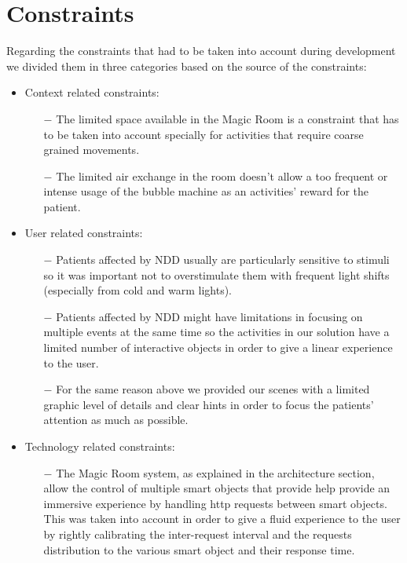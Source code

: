 \section{Constraints}
	Regarding the constraints that had to be taken into account during development we divided them in three categories based on the source of the constraints:
	\begin{itemize}
		\item Context related constraints:
		\begin{itemize}
			\item[$ - $] The limited space available in the Magic Room is a constraint that has to be taken into account specially for activities that require coarse grained movements.
			\item[$ - $] The limited air exchange in the room doesn't allow a too frequent or intense usage of the bubble machine as an activities' reward for the patient.
		\end{itemize}
	\end{itemize}
	\begin{itemize}
		\item User related constraints:
		\begin{itemize}
			\item[$ - $] Patients affected by NDD usually are particularly sensitive to stimuli so it was important not to overstimulate them with frequent light shifts (especially from cold and warm lights).
			\item[$ - $] Patients affected by NDD might have limitations in focusing on multiple events at the same time so the activities in our solution have a limited number of interactive objects in order to give a linear experience to the user.
			\item[$ - $] For the same reason above we provided our scenes with a limited graphic level of details and clear hints in order to focus the patients' attention as much as possible.
		\end{itemize}
	\end{itemize}
	\begin{itemize}
		\item Technology related constraints:
		\begin{itemize}
			\item[$ - $] The Magic Room system, as explained in the architecture section, allow the control of multiple smart objects that provide help provide an immersive experience by handling http requests between smart objects. This was taken into account in order to give a fluid experience to the user by rightly calibrating the inter-request interval and the requests distribution to the various smart object and their response time.
		\end{itemize}
	\end{itemize}

